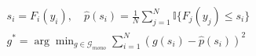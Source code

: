 ﻿\documentclass{article}
\begin{document}
\begin{preview}
\(\displaystyle
\begin{gathered}
  s_i = F_i(y_i), \quad
  \hat p(s_i)
  = \frac{1}{N}\sum_{j=1}^{N}\mathbb{I}\{F_j(y_j)\leq s_i\} \\
  g^*
  = \arg\min_{g\in\mathcal{G}_{mono}}
  \sum_{i=1}^{N}\left(g(s_i)-\hat p(s_i)\right)^2 
\end{gathered}
\)
\end{preview}
\end{document}

